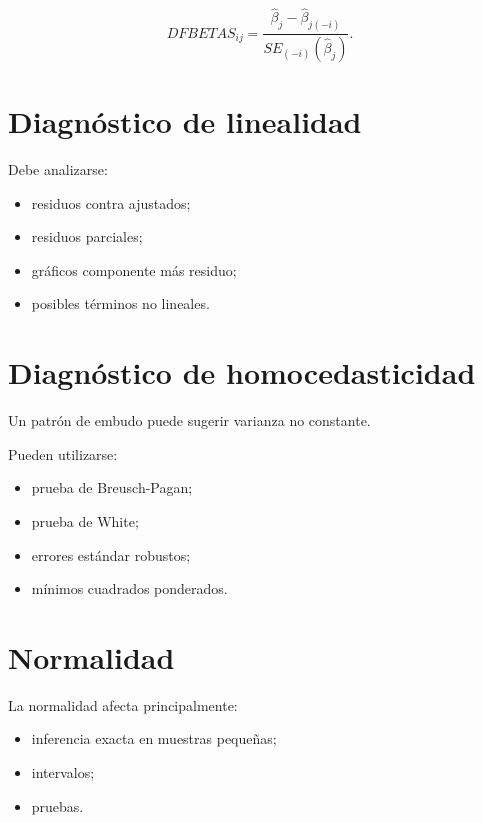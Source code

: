 \documentclass[
  spanish,
  10.5pt,
  letterpaper,
  DIV=11,
  numbers=noendperiod,
  oneside,
  open=any]{scrreprt}
\providecommand{\tightlist}{%
  \setlength{\itemsep}{0pt}\setlength{\parskip}{0pt}}
\theoremstyle{definition}
\theoremstyle{definition}
\theoremstyle{plain}
\theoremstyle{remark}
\begin{document}
\[
DFBETAS_{ij}
=
\frac{
\widehat{\beta}_j
-
\widehat{\beta}_{j(-i)}
}{
SE_{(-i)}(\widehat{\beta}_j)
}.
\]

\section*{Diagnóstico de linealidad}\label{diagnuxf3stico-de-linealidad}


Debe analizarse:

\begin{itemize}
\tightlist
\item
  residuos contra ajustados;
\item
  residuos parciales;
\item
  gráficos componente más residuo;
\item
  posibles términos no lineales.
\end{itemize}

\section*{Diagnóstico de
homocedasticidad}\label{diagnuxf3stico-de-homocedasticidad}


Un patrón de embudo puede sugerir varianza no constante.

Pueden utilizarse:

\begin{itemize}
\tightlist
\item
  prueba de Breusch-Pagan;
\item
  prueba de White;
\item
  errores estándar robustos;
\item
  mínimos cuadrados ponderados.
\end{itemize}

\section*{Normalidad}\label{normalidad-1}


La normalidad afecta principalmente:

\begin{itemize}
\tightlist
\item
  inferencia exacta en muestras pequeñas;
\item
  intervalos;
\item
  pruebas.
\end{itemize}
\end{document}
